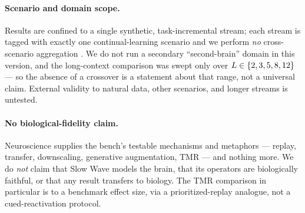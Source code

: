 \paragraph{Scenario and domain scope.} Results are confined to a single
synthetic, task-incremental stream; each stream is tagged with exactly one
continual-learning scenario and we perform \emph{no} cross-scenario aggregation
\citep{vandeven2022threetypes}. We do not run a secondary ``second-brain'' domain
in this version, and the long-context comparison was swept only over
$L\in\{2, 3, 5, 8, 12\}$ --- so the absence of a crossover is a statement
about that range, not a universal claim. External validity to natural data,
other scenarios, and longer streams is untested.

\paragraph{No biological-fidelity claim.} Neuroscience supplies the bench's
testable mechanisms and metaphors --- replay, transfer, downscaling, generative
augmentation, TMR --- and nothing more. We do \emph{not} claim that Slow Wave
models the brain, that its operators are biologically faithful, or that any
result transfers to biology. The TMR comparison in particular is to a benchmark
effect size, via a prioritized-replay analogue, not a cued-reactivation protocol.
